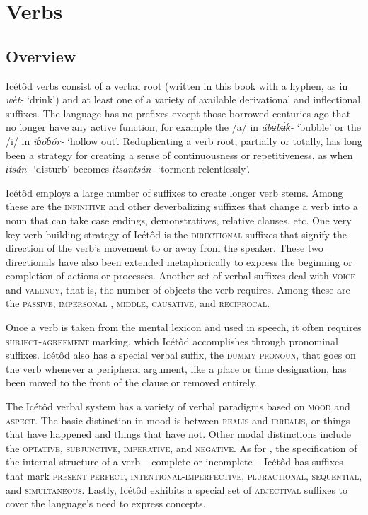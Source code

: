 \section{Verbs}\label{sec:8}



\subsection{Overview}\label{sec:8.1}


Icétôd verbs consist of a verbal root (written in this book with a hyphen, as in \textit{wèt-} ‘drink’) and at least one of a variety of available derivational and inflectional suffixes. The language has no prefixes except those borrowed centuries ago that no longer have any active function, for example the /a/ in \textit{áb\`{ʉ}b\`{ʉ}ƙ-} ‘bubble’ or the /i/ in \textit{iɓóɓór-} ‘hollow out’. Reduplicating a verb root, partially or totally, has long been a strategy for creating a sense of continuousness or repetitiveness, as when \textit{ɨtsán-} ‘disturb’ becomes \textit{ɨtsan{\Í}tsán-} ‘torment relentlessly’. 

Icétôd employs a large number of suffixes to create longer verb stems. Among these are the \textsc{infinitive} and other deverbalizing suffixes that change a verb into a noun that can take case endings, demonstratives, relative clauses, etc. One very key verb-building strategy of Icétôd is the \textsc{directional} suffixes that signify the direction of the verb’s movement to or away from the speaker. These two directionals have also been extended metaphorically to express the beginning or completion of actions or processes. Another set of verbal suffixes deal with \textsc{voice} and \textsc{valency}, that is, the number of objects the verb requires. Among these are the \textsc{passive}, \textsc{impersonal} , \textsc{middle}, \textsc{causative}, and \textsc{reciprocal}.

Once a verb is taken from the mental lexicon and used in speech, it often requires \textsc{subject-agreement} marking, which Icétôd accomplishes through pronominal suffixes. Icétôd also has a special verbal suffix, the \textsc{dummy} \textsc{pronoun}, that goes on the verb whenever a peripheral argument, like a place or time designation, has been moved to the front of the clause or removed entirely.

The Icétôd verbal system has a variety of verbal paradigms based on \textsc{mood} and \textsc{aspect}. The basic distinction in mood is between \textsc{realis} and \textsc{irrealis}, or things that have happened and things that have not. Other modal distinctions include the \textsc{optative}, \textsc{subjunctive}, \textsc{imperative}, and \textsc{negative}. As for , the specification of the internal structure of a verb – complete or incomplete – Icétôd has suffixes that mark \textsc{present perfect}, \textsc{intentional}{}-\textsc{imperfective}, \textsc{pluractional}, \textsc{sequential}, and \textsc{simultaneous}. Lastly, Icétôd exhibits a special set of \textsc{adjectival} suffixes to cover the language’s need to express  concepts.




